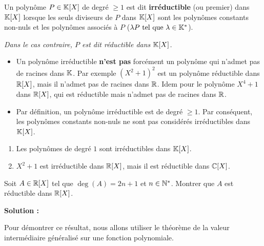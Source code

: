 \documentclass[12pt, a4paper]{report}
\begin{document}
\begin{definition}
    Un polynôme $P \in \mathbb{K}[X]$ de degré $\ge 1$ est dit \textbf{irréductible} (ou premier) dans $\mathbb{K}[X]$ lorsque les seuls diviseurs de $P$ dans $\mathbb{K}[X]$ sont les polynômes constants non-nuls et les polynômes associés à $P$ ($\lambda P \text{ tel que } \lambda \in \mathbb{K}^*$).

    \textit{Dans le cas contraire, $P$ est dit réductible dans $\mathbb{K}[X]$.}
\end{definition}

\begin{attention}
    \begin{itemize}
        \item Un polynôme irréductible \textbf{n'est pas} forcément un polynôme qui n'admet pas de racines dans $\mathbb{K}$. Par exemple $(X^2+1)^2$ est un polynôme réductible dans $\mathbb{R}[X]$, mais il n'admet pas de racines dans $\mathbb{R}$. Idem pour le polynôme $X^4+1$ dans $\mathbb{R}[X]$, qui est réductible mais n'admet pas de racines dans $\mathbb{R}$.
        \item Par définition, un polynôme irréductible est de degré $\ge 1$. Par conséquent, les polynômes constants non-nuls ne sont pas considérés irréductibles dans $\mathbb{K}[X]$.
    \end{itemize}
\end{attention}

\begin{example}
    \begin{enumerate}
        \item Les polynômes de degré $1$ sont irréductibles dans $\mathbb{K}[X]$.
        \item $X^2 + 1$ est irréductible dans $\mathbb{R}[X]$, mais il est réductible dans $\mathbb{C}[X]$.
    \end{enumerate}
\end{example}

\begin{exercise}
    Soit $A \in \mathbb{R}[X]$ tel que $\deg(A) = 2n+1$ et $n\in\mathbb{N}^*$. Montrer que $A$ est réductible dans $\mathbb{R}[X]$.

    \textbf{Solution :}

    Pour démontrer ce résultat, nous allons utiliser le théorème de la valeur intermédiaire généralisé sur une fonction polynomiale.
\end{exercise}
\end{document}
